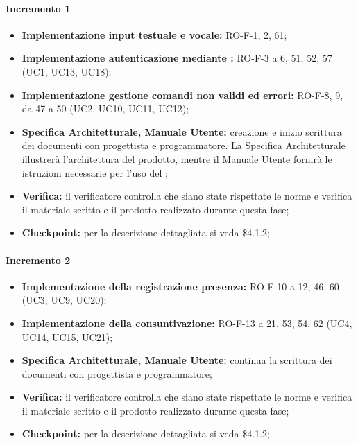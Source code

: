 \paragraph{Incremento 1}
\begin{itemize}
    \item \textbf{Implementazione input testuale e vocale:} RO-F-1, 2, 61;
    \item \textbf{Implementazione autenticazione mediante :} RO-F-3 a 6, 51, 52, 57 (UC1, UC13, UC18);
    \item \textbf{Implementazione gestione comandi non validi ed errori:} RO-F-8, 9, da 47 a 50 (UC2, UC10, UC11, UC12);
    \item \textbf{Specifica Architetturale, Manuale Utente:} creazione e inizio scrittura dei documenti con progettista e programmatore. La Specifica Architetturale illustrerà l'architettura del prodotto, mentre il Manuale Utente fornirà le istruzioni necessarie per l'uso del ;
    \item \textbf{Verifica:} il verificatore controlla che siano state rispettate le norme e verifica il materiale scritto e il prodotto realizzato durante questa fase;
    \item \textbf{Checkpoint:} per la descrizione dettagliata si veda \$4.1.2;
\end{itemize}

\paragraph{Incremento 2}
\begin{itemize}
    \item \textbf{Implementazione della registrazione presenza:} RO-F-10 a 12, 46, 60 (UC3, UC9, UC20);
    \item \textbf{Implementazione della consuntivazione:} RO-F-13 a 21, 53, 54, 62 (UC4, UC14, UC15, UC21);
    \item \textbf{Specifica Architetturale, Manuale Utente:} continua la scrittura dei documenti con progettista e programmatore;
    \item \textbf{Verifica:} il verificatore controlla che siano state rispettate le norme e verifica il materiale scritto e il prodotto realizzato durante questa fase;
    \item \textbf{Checkpoint:} per la descrizione dettagliata si veda \$4.1.2;
\end{itemize}

